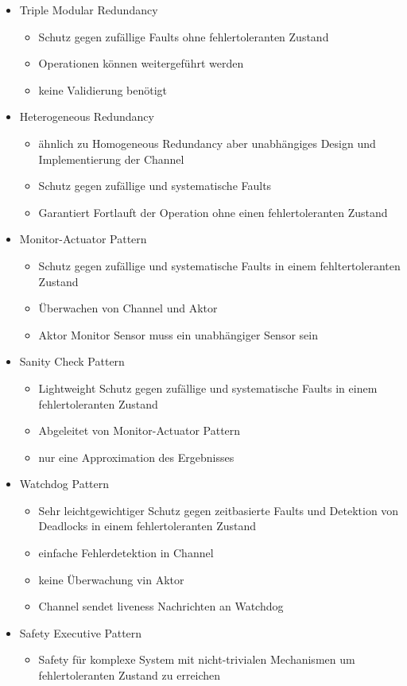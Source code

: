 \documentclass[paper=a4, fontsize=11pt]{scrartcl} %
\numberwithin{equation}{section} %
\numberwithin{figure}{section} %
\numberwithin{table}{section} %
\begin{document}
\begin{itemize}
\begin{itemize}
\begin{itemize}
    \end{itemize}
    \item Triple Modular Redundancy
    \begin{itemize}
      \item Schutz gegen zufällige Faults ohne fehlertoleranten Zustand
      \item Operationen können weitergeführt werden
      \item keine Validierung benötigt
    \end{itemize}
    \item Heterogeneous Redundancy
    \begin{itemize}
      \item ähnlich zu Homogeneous Redundancy aber unabhängiges Design und Implementierung der Channel
      \item Schutz gegen zufällige und systematische Faults
      \item Garantiert Fortlauft der Operation ohne einen fehlertoleranten Zustand
    \end{itemize}
    \item Monitor-Actuator Pattern
    \begin{itemize}
      \item Schutz gegen zufällige und systematische Faults in einem fehltertoleranten Zustand
      \item Überwachen von Channel und Aktor
      \item Aktor Monitor Sensor muss ein unabhängiger Sensor sein
    \end{itemize}
    \item Sanity Check Pattern
    \begin{itemize}
      \item Lightweight Schutz gegen zufällige und systematische Faults in einem fehlertoleranten Zustand
      \item Abgeleitet von Monitor-Actuator Pattern
      \item nur eine Approximation des Ergebnisses
    \end{itemize}
    \item Watchdog Pattern
    \begin{itemize}
      \item Sehr leichtgewichtiger Schutz gegen zeitbasierte Faults und Detektion von Deadlocks in einem fehlertoleranten Zustand
      \item einfache Fehlerdetektion in Channel
      \item keine Überwachung vin Aktor
      \item Channel sendet liveness Nachrichten an Watchdog
    \end{itemize}
    \item Safety Executive Pattern
    \begin{itemize}
      \item Safety für komplexe System mit nicht-trivialen Mechanismen um fehlertoleranten Zustand zu erreichen
    \end{itemize}
  \end{itemize}
\end{itemize}
\end{document}
